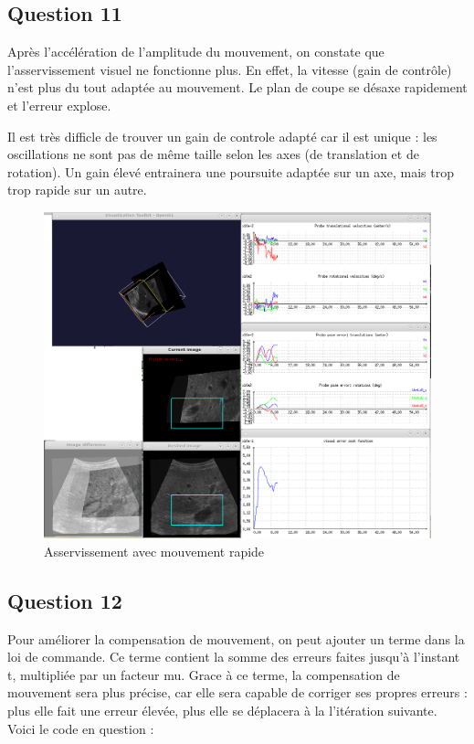 \documentclass[a4paper,11pt]{article}
\begin{document}
\subsection{Question 11}
Apr\`es l'acc\'el\'eration de l'amplitude du mouvement, on constate que l'asservissement visuel ne fonctionne plus. En effet, la vitesse (gain de contr\^ole) n'est plus du tout adapt\'ee au mouvement. Le plan de coupe se d\'esaxe rapidement et l'erreur explose. 
\par
Il est tr\`es difficle de trouver un gain de controle adapt\'e car il est unique : les oscillations ne sont pas de m\^eme taille selon les axes (de translation et de rotation). Un gain \'elev\'e entrainera une poursuite adapt\'ee sur un axe, mais trop trop rapide sur un autre.
\begin{figure}[H]
    \centering
    \includegraphics[width=0.5\textheight]{./images/q11_0,4.png}
    \caption{Asservissement avec mouvement rapide }
    \label{fastMove}
\end{figure}

\subsection{Question 12}
Pour am\'eliorer la compensation de mouvement, on peut ajouter un terme dans la loi de commande. Ce terme contient la somme des erreurs faites jusqu'\`a l'instant t, multipli\'ee par un facteur mu. Grace \`a ce terme, la compensation de mouvement sera plus pr\'ecise, car elle sera capable de corriger ses propres erreurs : plus elle fait une erreur \'elev\'ee, plus elle se d\'eplacera \`a la l'it\'eration suivante. Voici le code en question :
\end{document}
